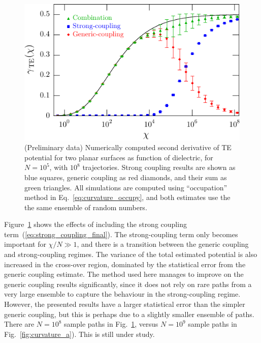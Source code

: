\begin{figure}
  \centering
  \includegraphics[width=0.8\columnwidth]{fig/numerics/curvature_c}
  \caption[(Preliminary data) Numerical TE Potential Curvature for two planar surfaces, evaluated with strong-coupling methods]{
(Preliminary data) Numerically computed second derivative of TE potential for two planar surfaces as function 
    of dielectric, for $N=10^5$, with $10^8$ trajectories.
    Strong coupling results are shown as blue squares, generic coupling as red diamonds, 
    and their sum as green triangles.  
    All simulations are computed using
  ``occupation'' method in Eq.~\ref{eq:curvature_occupy}, and both estimates use the the same ensemble of random numbers.}
\label{fig:curvature_c}
\end{figure}

Figure~\ref{fig:curvature_c} shows the effects of including the strong coupling term~(\ref{eq:strong_coupling_final}).  
The strong-coupling term only becomes important for $\chi/N\gg 1$,
and there is a transition between the generic coupling and strong-coupling regimes. 
The variance of the total estimated potential is also increased in the cross-over region, 
dominated by the statistical error from the generic coupling estimate.  
The method used here manages to improve on the generic coupling results significantly, since 
it does not rely on rare paths from a very large ensemble to capture the behaviour in the strong-coupling regime.
However, the presented results have a larger statistical error than the simpler generic coupling, but this is 
perhaps due to a slightly smaller ensemble of paths.  There are $N=10^8$ sample paths in Fig.~\ref{fig:curvature_c}, versus $N=10^9$ 
sample paths in Fig.~\ref{fig:curvature_a}).  This is
still under study.   

